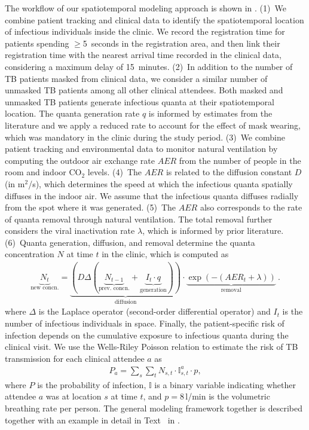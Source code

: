 \documentclass[fleqn,11pt]{wlscirep}
\begin{document}
The workflow of our spatiotemporal modeling approach is shown in . (1)~We combine patient tracking and clinical data to identify the spatiotemporal location of infectious individuals inside the clinic. We record the registration time for patients spending $\geq$5~seconds in the registration area, and then link their registration time with the nearest arrival time recorded in the clinical data, considering a maximum delay of 15~minutes. (2)~In addition to the number of TB patients masked from clinical data, we consider a similar number of unmasked TB patients among all other clinical attendees\cite{Berhanu2023CID}. Both masked and unmasked TB patients generate infectious quanta at their spatiotemporal location. The quanta generation rate $q$ is informed by estimates from the literature\cite{Andrews2014JID,Riley1962ARRD,Escombe2008PLoSMed,Nardell1991ARRD} and we apply a reduced rate to account for the effect of mask wearing\cite{Dharmadhikari2012AJRCCM}, which was mandatory in the clinic during the study period. (3)~We combine patient tracking and environmental data to monitor natural ventilation by computing the outdoor air exchange rate $AER$ from the number of people in the room and indoor CO$_2$ levels\cite{Batterman2017IJERPH}. (4)~The $AER$ is related to the diffusion constant $D$ (in m$^2$/s)\cite{Cheng2011EnvSciTech}, which determines the speed at which the infectious quanta spatially diffuses in the indoor air. We assume that the infectious quanta diffuses radially from the spot where it was generated. (5)~The $AER$ also corresponds to the rate of quanta removal through natural ventilation. The total removal further considers the viral inactivation rate $\lambda$, which is informed by prior literature\cite{Loudon1969AMRRD,Lever2000LettersAppliedMicrobio,Gannon2007ResVetSci,Klein2014IJMyco}. (6)~Quanta generation, diffusion, and removal determine the quanta concentration $N$ at time $t$ in the clinic, which is computed as 
\begin{align}\label{eq:spattemp-N}
    \underbrace{N_{t}}_{\text{new concn.}} = \underbrace{\left(D \Delta (\underbrace{N_{t-1}}_{\text{prev. concn.}} + \underbrace{I_t \cdot q}_{\text{generation}})\right)}_{\text{diffusion}} \cdot \underbrace{\exp\left(-(AER_t + \lambda)\right)}_{\text{removal}} ~.
\end{align}
where $\Delta$ is the Laplace operator (second-order differential operator) and $I_t$ is the number of infectious individuals in space. Finally, the patient-specific risk of infection depends on the cumulative exposure to infectious quanta during the clinical visit. We use the Wells-Riley Poisson relation to estimate the risk of TB transmission for each clinical attendee $a$ as 
\begin{align}
    P_a = \sum_s \sum_t N_{s,t} \cdot \mathbb{I}_{s,t}^a \cdot p,
\end{align}
where $P$ is the probability of infection, $\mathbb{I}$ is a binary variable indicating whether attendee $a$ was at location $s$ at time $t$, and $p = 8$\,l/min is the volumetric breathing rate per person. The general modeling framework together is described together with an example in detail in Text~ in \supp. 
\end{document}
